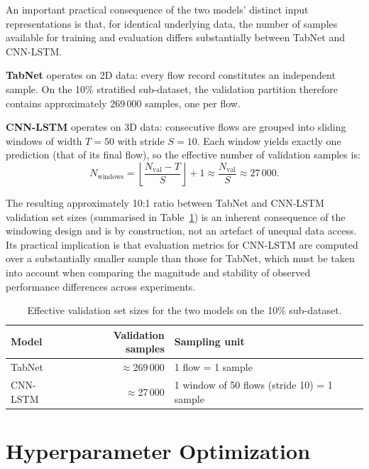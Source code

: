 \documentclass[../main.tex]{subfiles}
\begin{document}
An important practical consequence of the two models' distinct input representations is that, for identical underlying data, the number of samples available for training and evaluation differs substantially between TabNet and CNN-LSTM.

\textbf{TabNet} operates on 2D data: every flow record constitutes an independent sample.  On the 10\% stratified sub-dataset, the validation partition therefore contains approximately $269\,000$ samples, one per flow.

\textbf{CNN-LSTM} operates on 3D data: consecutive flows are grouped into sliding windows of width $T = 50$ with stride $S = 10$.  Each window yields exactly one prediction (that of its final flow), so the effective number of validation samples is:
\[
    N_{\text{windows}} = \left\lfloor \frac{N_{\text{val}} - T}{S} \right\rfloor + 1
    \approx \frac{N_{\text{val}}}{S} \approx 27\,000.
\]

The resulting approximately 10:1 ratio between TabNet and CNN-LSTM validation set sizes (summarised in Table~\ref{tab:sample-sizes}) is an inherent consequence of the windowing design and is by construction, not an artefact of unequal data access.  Its practical implication is that evaluation metrics for CNN-LSTM are computed over a substantially smaller sample than those for TabNet, which must be taken into account when comparing the magnitude and stability of observed performance differences across experiments.

\begin{table}[H]
\centering
\caption{Effective validation set sizes for the two models on the 10\% sub-dataset.}
\label{tab:sample-sizes}
\small
\begin{tabular}{lrl}
\toprule
\textbf{Model}  & \textbf{Validation samples} & \textbf{Sampling unit} \\
\midrule
TabNet          & $\approx$269\,000           & 1 flow = 1 sample \\
CNN-LSTM        & $\approx$27\,000            & 1 window of 50 flows (stride 10) = 1 sample \\
\bottomrule
\end{tabular}
\end{table}


\newpage
\section{Hyperparameter Optimization}
\label{sec:hpo}
\end{document}
